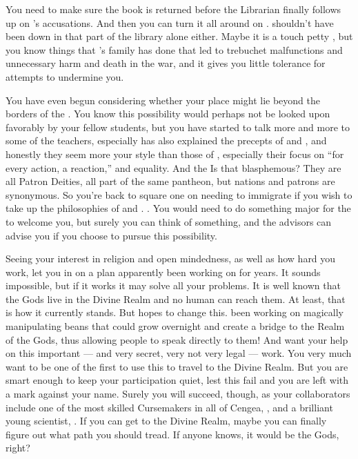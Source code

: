 \documentclass[char]{GL2020}
\begin{document}
You need to make sure the book is returned before the Librarian finally follows up on \cLibAssist{}’s accusations. And then you can turn it all around on \cLibAssist{}. \cLibAssist{\They} shouldn’t have been down in that part of the library alone either. Maybe it is a touch petty , but you know things that \cLibAssist{}’s family has done that led to trebuchet malfunctions and unnecessary harm and death in the war, and it gives you little tolerance for \cLibAssist{\their} attempts to undermine you. 

You have even begun considering whether your place might lie beyond the borders of the \pTech{}. You know this possibility would perhaps not be looked upon favorably by your fellow \pTech{} students, but you have started to talk more and more to some of the \pShip teachers, especially \cFlowPriest{} has also explained the precepts of \cEbb{} and \cFlow{}, and honestly they seem more your style than those of \cTechGod{}, especially their focus on “for every action, a reaction,” and equality. And the  Is that blasphemous? They are all Patron Deities, all part of the same pantheon, but nations and patrons are synonymous. So you’re back to square one on needing to immigrate if you wish to take up the philosophies of \cEbb{} and \cFlow{}. . You would need to do something major for the \pShippies{} to welcome you, but surely you can think of something, and the \pShippie{} advisors can advise you if you choose to pursue this possibility.


Seeing your interest in \cFlowPriest{\their} religion and open mindedness, as well as how hard you work, \cFlowPriest{\they} let you in on a plan  apparently been working on for years. It sounds impossible, but if it works it may solve all your problems. It is well known that the Gods live in the Divine Realm and no human can reach them. At least, that is how it currently stands. But \cFlowPriest{} hopes to change this. \cFlowPriest{\They \have} been working on magically manipulating beans that could grow overnight and create a bridge to the Realm of the Gods, thus allowing people to speak directly to them! And \cFlowPriest{\they} want\cFlowPriest{\verbs} your help on this important — and very secret, very not very legal — work. You very much want to be one of the first to use this to travel to the Divine Realm. But you are smart enough to keep your participation quiet, lest this fail and you are left with a mark against your name. Surely you will succeed, though, as your collaborators include one of the most skilled Cursemakers in all of Cengea, \cCurse{\full}, and a brilliant young \pTech{} scientist, \cAssistantScientist{\full}. If you can get to the Divine Realm, maybe you can finally figure out what path you should tread. If anyone knows, it would be the Gods, right? 
\end{document}
